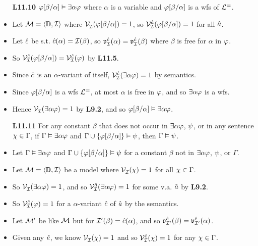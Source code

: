 \documentclass[a4paper, 11pt]{article} %
\begin{document}
\begin{itemize}
  \item[\bf L11.10] $\varphi[\beta/\alpha] \vDash \exists\alpha\varphi$ where $\alpha$ is a variable and $\varphi[\beta/\alpha]$ is a wfs of $\mathcal{L}^=$.
    \item Let $\mathcal{M}=\langle\mathbb{D},\mathcal{I}\rangle$ where $\mathcal{V}_{\mathcal{I}}^{}(\varphi[\beta/\alpha])=1$, so $\mathcal{V}_{\mathcal{I}}^{\hat{a}}(\varphi[\beta/\alpha])=1$ for all $\hat{a}$.
    \item Let $\hat{c}$ be s.t. $\hat{c}(\alpha)=\mathcal{I}(\beta)$, so $\mathfrak{v}_{\mathcal{I}}^{\hat{c}}(\alpha)=\mathfrak{v}_{\mathcal{I}}^{\hat{c}}(\beta)$ where $\beta$ is free for $\alpha$ in $\varphi$.
    \item So $\mathcal{V}_{\mathcal{I}}^{\hat{c}}(\varphi[\beta/\alpha])=\mathcal{V}_{\mathcal{I}}^{\hat{c}}(\varphi)$ by \textbf{L11.5}.
    \item Since $\hat{c}$ is an $\alpha$-variant of itself, $\mathcal{V}_{\mathcal{I}}^{\hat{c}}(\exists \alpha\varphi)=1$ by semantics.
    \item Since $\varphi[\beta/\alpha]$ is a wfs $\mathcal{L}^=$, at most $\alpha$ is free in $\varphi$, and so $\exists \alpha\varphi$ is a wfs. 
    \item Hence $\mathcal{V}_{\mathcal{I}}^{}(\exists \alpha\varphi)=1$ by \textbf{L9.2}, and so $\varphi[\beta/\alpha] \vDash \exists\alpha\varphi$.
  \item[\bf L11.11] For any constant $\beta$ that does not occur in $\exists\alpha\varphi$, $\psi$, or in any sentence $\chi\in\Gamma$, if $\Gamma \vDash \exists\alpha\varphi$ and $\Gamma \cup \lbrace\varphi[\beta/\alpha]\rbrace \vDash \psi$, then $\Gamma \vDash \psi$.
    \item Let $\Gamma \vDash \exists\alpha\varphi$ and $\Gamma \cup \lbrace\varphi[\beta/\alpha]\rbrace \vDash \psi$ for a constant $\beta$ not in $\exists\alpha\varphi$, $\psi$, or $\Gamma$. 
    \item Let $\mathcal{M}=\langle\mathbb{D},\mathcal{I}\rangle$ be a model where $\mathcal{V}_{\mathcal{I}}^{}(\chi) = 1$ for all $\chi \in \Gamma$.
    \item So $\mathcal{V}_{\mathcal{I}}^{}(\exists \alpha\varphi) = 1$, and so $\mathcal{V}_{\mathcal{I}}^{\hat{a}}(\exists \alpha\varphi)=1$ for some v.a. $\hat{a}$ by \textbf{L9.2}.
    \item So $\mathcal{V}_{\mathcal{I}}^{\hat{c}}(\varphi)=1$ for a $\alpha$-variant $\hat{c}$ of $\hat{a}$ by the semantics.
    \item Let $\mathcal{M}'$ be like $\mathcal{M}$ but for $\mathcal{I}'(\beta)=\hat{c}(\alpha)$, and so $\mathfrak{v}_{\mathcal{I}'}^{\hat{c}}(\beta)=\mathfrak{v}_{\mathcal{I}'}^{\hat{c}}(\alpha)$.
    \item Given any $\hat{e}$, we know $\mathcal{V}_{\mathcal{I}}^{}(\chi) = 1$ and so $\mathcal{V}_{\mathcal{I}}^{\hat{e}}(\chi) = 1$ for any $\chi \in \Gamma$.

\end{itemize}
\end{document}
